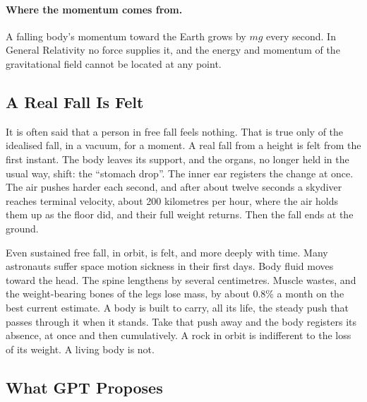 \paragraph{Where the momentum comes from.} A falling body's momentum toward the Earth grows by $mg$ every second. In General Relativity no force supplies it, and the energy and momentum of the gravitational field cannot be located at any point. 

\subsection*{A Real Fall Is Felt}

It is often said that a person in free fall feels nothing. That is true only of the idealised fall, in a vacuum, for a moment. A real fall from a height is felt from the first instant. The body leaves its support, and the organs, no longer held in the usual way, shift: the ``stomach drop''. The inner ear registers the change at once. The air pushes harder each second, and after about twelve seconds a skydiver reaches terminal velocity, about 200 kilometres per hour, where the air holds them up as the floor did, and their full weight returns. Then the fall ends at the ground.

Even sustained free fall, in orbit, is felt, and more deeply with time. Many astronauts suffer space motion sickness in their first days. Body fluid moves toward the head. The spine lengthens by several centimetres. Muscle wastes, and the weight-bearing bones of the legs lose mass, by about 0.8\% a month on the best current estimate. A body is built to carry, all its life, the steady push that passes through it when it stands. Take that push away and the body registers its absence, at once and then cumulatively. A rock in orbit is indifferent to the loss of its weight. A living body is not.

\subsection*{What GPT Proposes}

